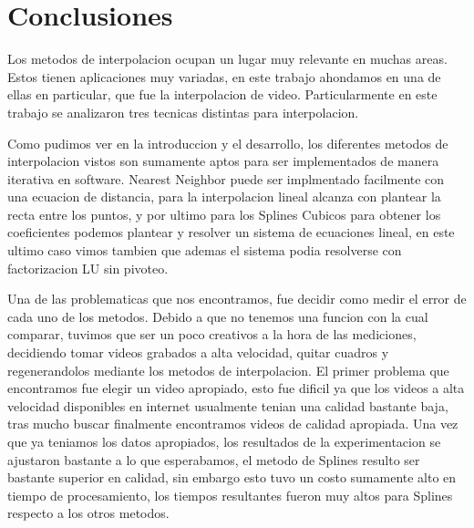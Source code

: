 \section{Conclusiones}

Los metodos de interpolacion ocupan un lugar muy relevante en muchas areas. Estos tienen aplicaciones muy variadas, en este trabajo ahondamos en una de ellas en particular, que fue la interpolacion de video. Particularmente en este trabajo se analizaron tres tecnicas distintas para interpolacion.

Como pudimos ver en la introduccion y el desarrollo, los diferentes metodos de interpolacion vistos son sumamente aptos para ser implementados de manera iterativa en software. Nearest Neighbor puede ser implmentado facilmente con una ecuacion de distancia, para la interpolacion lineal alcanza con plantear la recta entre los puntos, y por ultimo para los Splines Cubicos para obtener los coeficientes podemos plantear y resolver un sistema de ecuaciones lineal, en este ultimo caso vimos tambien que ademas el sistema podia resolverse con factorizacion LU sin pivoteo.

Una de las problematicas que nos encontramos, fue decidir como medir el error de cada uno de los metodos. Debido a que no tenemos una funcion con la cual comparar, tuvimos que ser un poco creativos a la hora de las mediciones, decidiendo tomar videos grabados a alta velocidad, quitar cuadros y regenerandolos mediante los metodos de interpolacion. El primer problema que encontramos fue elegir un video apropiado, esto fue dificil ya que los videos a alta velocidad disponibles en internet usualmente tenian una calidad bastante baja, tras mucho buscar finalmente encontramos videos de calidad apropiada. Una vez que ya teniamos los datos apropiados, los resultados de la experimentacion se ajustaron bastante a lo que esperabamos, el metodo de Splines resulto ser bastante superior en calidad, sin embargo esto tuvo un costo sumamente alto en tiempo de procesamiento, los tiempos resultantes fueron muy altos para Splines respecto a los otros metodos.

